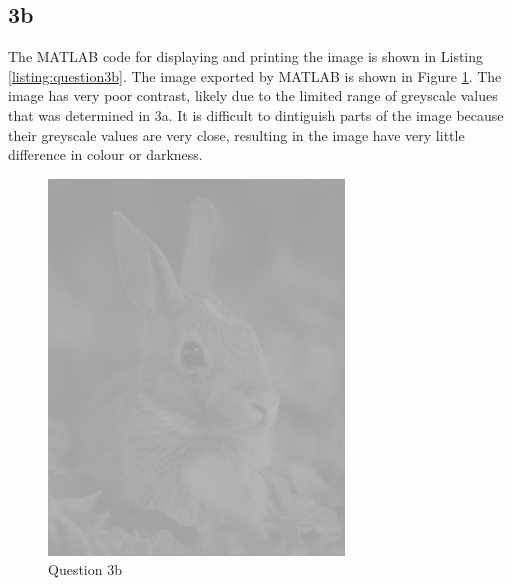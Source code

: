 \documentclass[12pt]{article}
\begin{document}
\subsection*{3b}
The MATLAB code for displaying and printing the image is shown in Listing \ref{listing:question3b}. The image exported by MATLAB is shown in Figure \ref{fig:question3b}. The image has very poor contrast, likely due to the limited range of greyscale values that was determined in 3a. It is difficult to dintiguish parts of the image because their greyscale values are very close, resulting in the image have very little difference in colour or darkness.

\begin{figure}[!ht]
    \centering
    \includegraphics[width=0.7\textwidth]{question3b.png}
    \caption{Question 3b}
    \label{fig:question3b}
\end{figure} \pagebreak
\end{document}
